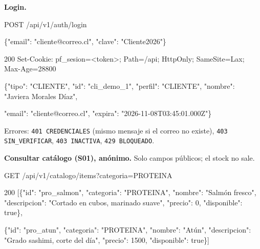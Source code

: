 \textbf{Login.}


\begin{codigo}
POST /\allowbreak{}api/\allowbreak{}v1/\allowbreak{}auth/\allowbreak{}login\par
\{"email":\allowbreak{} "cliente@correo.\allowbreak{}cl",\allowbreak{} "clave":\allowbreak{} "Cliente2026"\}\par
\end{codigo}

\begin{codigo}
200  Set-\allowbreak{}Cookie:\allowbreak{} pf\_\allowbreak{}sesion=\allowbreak{}<token>; Path=\allowbreak{}/\allowbreak{}api; HttpOnly; SameSite=\allowbreak{}Lax; Max-\allowbreak{}Age=\allowbreak{}28800\par
\{"tipo":\allowbreak{} "CLIENTE",\allowbreak{} "id":\allowbreak{} "cli\_\allowbreak{}demo\_\allowbreak{}1",\allowbreak{} "perfil":\allowbreak{} "CLIENTE",\allowbreak{} "nombre":\allowbreak{} "Javiera Morales Díaz",\allowbreak{}\par
\hspace*{1\ttw}"email":\allowbreak{} "cliente@correo.\allowbreak{}cl",\allowbreak{} "expira":\allowbreak{} "2026-\allowbreak{}11-\allowbreak{}08T03:\allowbreak{}45:\allowbreak{}01.\allowbreak{}000Z"\}\par
\end{codigo}

Errores: \texttt{401 CREDENCIALES} (mismo mensaje si el correo no existe), \texttt{403 SIN\_\allowbreak{}VERIFICAR}, \texttt{403 INACTIVA}, \texttt{429 BLOQUEADO}.


\textbf{Consultar catálogo (S01), anónimo.} Solo campos públicos; el stock no sale.


\begin{codigo}
GET /\allowbreak{}api/\allowbreak{}v1/\allowbreak{}catalogo/\allowbreak{}items?\allowbreak{}categoria=\allowbreak{}PROTEINA\par
\end{codigo}

\begin{codigo}
200 [\allowbreak{}\{"id":\allowbreak{} "pro\_\allowbreak{}salmon",\allowbreak{} "categoria":\allowbreak{} "PROTEINA",\allowbreak{} "nombre":\allowbreak{} "Salmón fresco",\allowbreak{} "descripcion":\allowbreak{} "Cortado en cubos,\allowbreak{} marinado suave",\allowbreak{} "precio":\allowbreak{} 0,\allowbreak{} "disponible":\allowbreak{} true\},\allowbreak{}\par
\hspace*{5\ttw}\{"id":\allowbreak{} "pro\_\allowbreak{}atun",\allowbreak{} "categoria":\allowbreak{} "PROTEINA",\allowbreak{} "nombre":\allowbreak{} "Atún",\allowbreak{} "descripcion":\allowbreak{} "Grado sashimi,\allowbreak{} corte del día",\allowbreak{} "precio":\allowbreak{} 1500,\allowbreak{} "disponible":\allowbreak{} true\}]\par
\end{codigo}

